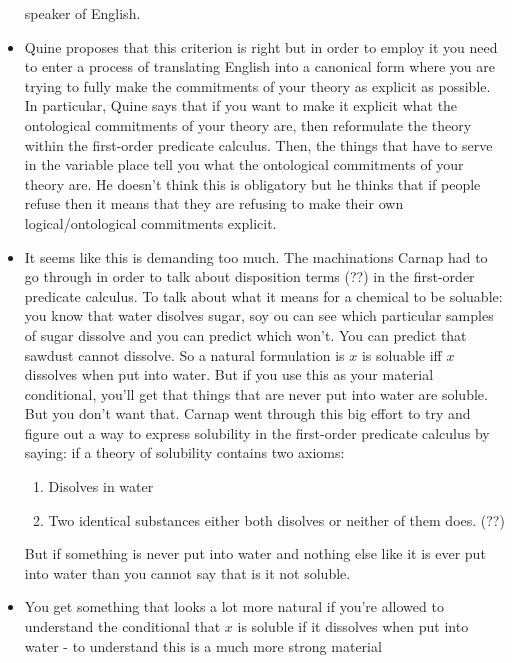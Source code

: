 \documentclass[12pt]{article}
\theoremstyle{definition}
\begin{document}
\begin{itemize}
        speaker of English. 
    \item
        Quine proposes that this criterion is right but in order to employ it
        you need to enter a process of translating English into a canonical
        form where you are trying to fully make the commitments of your theory
        as explicit as possible. In particular, Quine says that if you want to
        make it explicit what the ontological commitments of your theory are,
        then reformulate the theory within the first-order predicate calculus.
        Then, the things that have to serve in the variable place tell you what
        the ontological commitments of your theory are. He doesn't think this
        is obligatory but he thinks that if people refuse then it means that
        they are refusing to make their own logical/ontological commitments
        explicit.
    \item
        It seems like this is demanding too much. The machinations Carnap had
        to go through in order to talk about disposition terms (??) in the
        first-order predicate calculus. To talk about what it means for a
        chemical to be soluable: you know that water disolves sugar, soy ou can
        see which particular samples of sugar dissolve and you can predict
        which won't. You can predict that sawdust cannot dissolve. So a natural
        formulation is $x$ is soluable iff $x$ dissolves when put into water.
        But if you use this as your material conditional, you'll get that
        things that are never put into water are soluble. But you don't want
        that. Carnap went through this big effort to try and figure out a way
        to express solubility in the first-order predicate calculus by saying:
        if a theory of solubility contains two axioms:
        \begin{enumerate}
            \item Disolves in water
            \item Two identical substances either both disolves or neither of
                them does. (??)
        \end{enumerate}
        But if something is never put into water and nothing else like it is
        ever put into water than you cannot say that is it not soluble.
    \item
        You get something that looks a lot more natural if you're allowed to
        understand the conditional that $x$ is soluble if it dissolves when put
        into water - to understand this is a much more strong material

\end{itemize}
\end{document}
